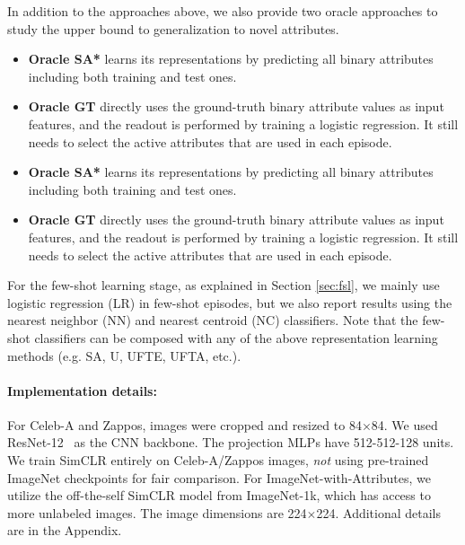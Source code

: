 In addition to the approaches above, we also provide two oracle approaches to study the upper bound to generalization to novel attributes.

\iflatexml
\begin{itemize}
\item \textbf{Oracle SA*} learns its representations by predicting all binary
    attributes including both training and test ones.
\item \textbf{Oracle GT} directly uses the ground-truth binary attribute values
    as input features, and the readout is performed by training a logistic
    regression. It still needs to select the active attributes that are used in
    each episode.
\end{itemize}
\else
\begin{itemize}[leftmargin=*]
\savespacebeforesection
\item \textbf{Oracle SA*} learns its representations by predicting all binary
attributes including both training and test ones.

\savespacebeforeitem
\item \textbf{Oracle GT} directly uses the ground-truth binary attribute values
as input features, and the readout is performed by training a logistic
regression. It still needs to select the active attributes that are used in
each episode.
\end{itemize}
\fi

\savespacebeforeitem
For the few-shot learning stage, as explained in Section \ref{sec:fsl}, we
mainly use logistic regression (LR) in few-shot episodes, but we also report
results using the nearest neighbor (NN) and nearest centroid (NC) classifiers.
Note that the few-shot classifiers can be composed with any of the above
representation learning methods (e.g. SA, U, UFTE, UFTA, etc.).

\savespacebeforesection
\paragraph{Implementation details:}
For Celeb-A and Zappos, images were cropped and resized to 84$\times$84. We
used ResNet-12~\citep{resnet,tadam} as the CNN backbone. The projection MLPs
have 512-512-128 units. We train SimCLR entirely on Celeb-A/Zappos images, \ie
\emph{not} using pre-trained ImageNet checkpoints for fair comparison. For
ImageNet-with-Attributes, we utilize the off-the-self SimCLR model from
ImageNet-1k, which has access to more unlabeled images. The image dimensions
are 224$\times$224. Additional details are in the Appendix.

